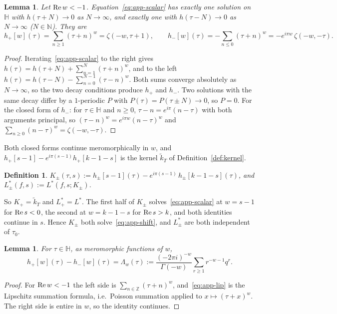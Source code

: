 \documentclass[11pt]{article}
\newtheorem{lemma}[theorem]{Lemma}
\newtheorem{definition}[theorem]{Definition}
\newcommand{\HH}{\mathbb{H}}
\newcommand{\ZZ}{\mathbb{Z}}
\newcommand{\NN}{\mathbb{N}}
\newcommand{\tk}{\widetilde{k}_T}
\begin{document}
\begin{lemma}\label{lem:app-hpm}
Let ${\rm Re}\,w<-1$. Equation~\eqref{eq:app-scalar} has exactly one solution on $\HH$ with
$h(\tau+N)\to0$ as $N\to\infty$, and exactly one with $h(\tau-N)\to0$ as $N\to\infty$ ($N\in\NN$).
They are
\begin{equation}\label{eq:app-hpm}
h_+[w](\tau)=\sum_{n\ge1}(\tau+n)^{w}=\zeta(-w,\tau+1),\qquad
h_-[w](\tau)=-\sum_{n\le0}(\tau+n)^{w}=-e^{i\pi w}\,\zeta(-w,-\tau).
\end{equation}
\end{lemma}

\begin{proof}
Iterating~\eqref{eq:app-scalar} to the right gives $h(\tau)=h(\tau+N)+\sum_{n=1}^{N}(\tau+n)^w$, and
to the left $h(\tau)=h(\tau-N)-\sum_{n=0}^{N-1}(\tau-n)^w$. Both sums converge absolutely as
$N\to\infty$, so the two decay conditions produce $h_+$ and $h_-$. Two solutions with the same
decay differ by a $1$-periodic $P$ with $P(\tau)=P(\tau\pm N)\to0$, so $P=0$. For the closed form
of $h_-$: for $\tau\in\HH$ and $n\ge0$, $\tau-n=e^{i\pi}(n-\tau)$ with both arguments principal, so
$(\tau-n)^w=e^{i\pi w}(n-\tau)^w$ and $\sum_{n\ge0}(n-\tau)^w=\zeta(-w,-\tau)$.
\end{proof}

Both closed forms continue meromorphically in $w$, and $h_+[s-1]-e^{i\pi(s-1)}h_+[k-1-s]$ is the
kernel $\tk$ of Definition~\ref{def:kernel}.

\begin{definition}\label{def:app-Kpm}
$K_\pm(\tau,s):=h_\pm[s-1](\tau)-e^{i\pi(s-1)}\,h_\pm[k-1-s](\tau)$, and
$L^*_\pm(f,s):=L^*(f,s;K_\pm)$.
\end{definition}

So $K_+=\tk$ and $L^*_+=L^*$. The first half of $K_\pm$ solves~\eqref{eq:app-scalar} at $w=s-1$
for ${\rm Re}\,s<0$, the second at $w=k-1-s$ for ${\rm Re}\,s>k$, and both identities continue in
$s$. Hence $K_\pm$ both solve~\eqref{eq:app-shift}, and $L^*_\pm$ are both independent of $\tau_0$.

\begin{lemma}\label{lem:app-lip}
For $\tau\in\HH$, as meromorphic functions of $w$,
\begin{equation}\label{eq:app-lip}
h_+[w](\tau)-h_-[w](\tau)=\Lambda_w(\tau):=\frac{(-2\pi i)^{-w}}{\Gamma(-w)}\sum_{r\ge1}r^{-w-1}q^r.
\end{equation}
\end{lemma}

\begin{proof}
For ${\rm Re}\,w<-1$ the left side is $\sum_{n\in\ZZ}(\tau+n)^w$, and~\eqref{eq:app-lip} is the
Lipschitz summation formula, i.e.\ Poisson summation applied to $x\mapsto(\tau+x)^w$. The right
side is entire in $w$, so the identity continues.
\end{proof}
\end{document}
